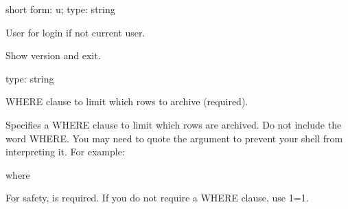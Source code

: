 \documentclass[letterpaper,10pt,english]{sphinxmanual}
\begin{document}
\begin{fulllineitems}
\label{\detokenize{mariadb-archiver:cmdoption-mariadb-archiver-user}}
short form: \sphinxhyphen{}u; type: string

User for login if not current user.

\end{fulllineitems}


\begin{fulllineitems}
\label{\detokenize{mariadb-archiver:cmdoption-mariadb-archiver-version}}
Show version and exit.

\end{fulllineitems}


\begin{fulllineitems}
\label{\detokenize{mariadb-archiver:cmdoption-mariadb-archiver-where}}
type: string

WHERE clause to limit which rows to archive (required).

Specifies a WHERE clause to limit which rows are archived.  Do not include the
word WHERE.  You may need to quote the argument to prevent your shell from
interpreting it.  For example:

\begin{sphinxVerbatim}[commandchars=\\\{\}]
\PYGZhy{}\PYGZhy{}where 
\end{sphinxVerbatim}

For safety, {\hyperref[\detokenize{mariadb-archiver:cmdoption-mariadb-archiver-where}]{}} is required.  If you do not require a WHERE clause, use
{\hyperref[\detokenize{mariadb-archiver:cmdoption-mariadb-archiver-where}]{}} 1=1.

\end{fulllineitems}
\end{document}

